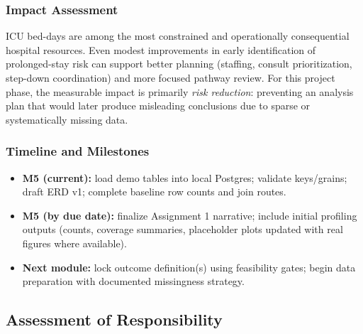 \documentclass[12pt]{article}
\begin{document}
\subsubsection*{Impact Assessment}
ICU bed-days are among the most constrained and operationally consequential hospital resources. Even modest improvements in early identification of prolonged-stay risk can support better planning (staffing, consult prioritization, step-down coordination) and more focused pathway review. For this project phase, the measurable impact is primarily \textit{risk reduction}: preventing an analysis plan that would later produce misleading conclusions due to sparse or systematically missing data.

\subsubsection*{Timeline and Milestones}
\begin{itemize}[leftmargin=1.5em]
    \item \textbf{M5 (current):} load demo tables into local Postgres; validate keys/grains; draft ERD v1; complete baseline row counts and join routes.
    \item \textbf{M5 (by due date):} finalize Assignment 1 narrative; include initial profiling outputs (counts, coverage summaries, placeholder plots updated with real figures where available).
    \item \textbf{Next module:} lock outcome definition(s) using feasibility gates; begin data preparation with documented missingness strategy.
\end{itemize}

\subsection{Assessment of Responsibility}
\label{subsec:responsibility}

%
%
\end{document}
